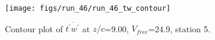 \begin{figure}[H]
\centering
\texttt{[image: figs/run\_46/run\_46\_tw\_contour]}
\caption{Contour plot of $\overline{t^\prime w^\prime}$ at $z/c$=9.00, $V_{free}$=24.9, station 5.}
\label{fig:run_46_tw_contour}
\end{figure}



